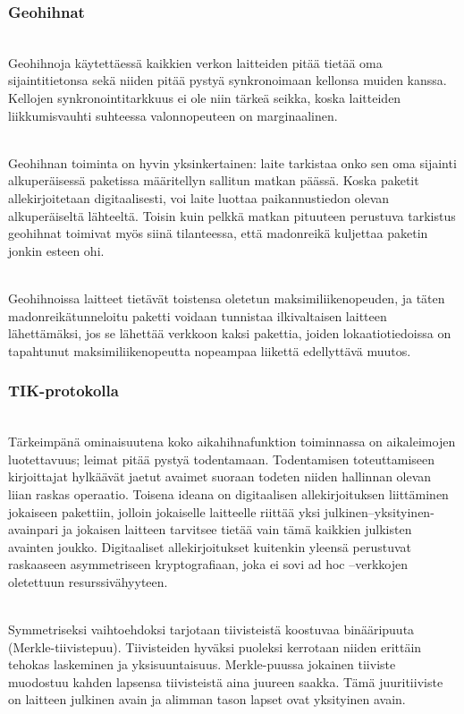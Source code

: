 \documentclass[finnish]{tktltiki2}
\theoremstyle{definition}
\theoremstyle{remark}
\begin{document}
\subsubsection{Geohihnat}
\noindent \\
Geohihnoja käytettäessä kaikkien verkon laitteiden pitää tietää oma sijaintitietonsa sekä niiden pitää pystyä synkronoimaan kellonsa muiden kanssa. Kellojen synkronointitarkkuus ei ole niin tärkeä seikka, koska laitteiden liikkumisvauhti suhteessa valonnopeuteen on marginaalinen.

\noindent \\
Geohihnan toiminta on hyvin yksinkertainen: laite tarkistaa onko sen oma sijainti alkuperäisessä paketissa määritellyn sallitun matkan päässä. Koska paketit allekirjoitetaan digitaalisesti, voi laite luottaa paikannustiedon olevan alkuperäiseltä lähteeltä. Toisin kuin pelkkä matkan pituuteen perustuva tarkistus geohihnat toimivat myös siinä tilanteessa, että madonreikä kuljettaa paketin jonkin esteen ohi.

\noindent \\
Geohihnoissa laitteet tietävät toistensa oletetun maksimiliikenopeuden, ja täten madonreikätunneloitu paketti voidaan tunnistaa ilkivaltaisen laitteen lähettämäksi, jos se lähettää verkkoon kaksi pakettia, joiden lokaatiotiedoissa on tapahtunut maksimiliikenopeutta nopeampaa liikettä edellyttävä muutos.

\subsubsection{TIK-protokolla} 
\label{tik}
\noindent \\
Tärkeimpänä ominaisuutena koko aikahihnafunktion toiminnassa on aikaleimojen luotettavuus; leimat pitää pystyä todentamaan. Todentamisen toteuttamiseen kirjoittajat hylkäävät jaetut avaimet suoraan todeten niiden hallinnan olevan liian raskas operaatio. Toisena ideana on digitaalisen allekirjoituksen liittäminen jokaiseen pakettiin, jolloin jokaiselle laitteelle riittää yksi julkinen--yksityinen-avainpari ja jokaisen laitteen tarvitsee tietää vain tämä kaikkien julkisten avainten joukko. Digitaaliset allekirjoitukset kuitenkin yleensä perustuvat raskaaseen asymmetriseen kryptografiaan, joka ei sovi ad hoc –verkkojen oletettuun resurssivähyyteen.

\noindent \\
Symmetriseksi vaihtoehdoksi tarjotaan tiivisteistä koostuvaa binääripuuta (Merkle-tiivistepuu). Tiivisteiden hyväksi puoleksi kerrotaan niiden erittäin tehokas laskeminen ja yksisuuntaisuus. Merkle-puussa jokainen tiiviste muodostuu kahden lapsensa tiivisteistä aina juureen saakka. Tämä juuritiiviste on laitteen julkinen avain ja alimman tason lapset ovat yksityinen avain.
\end{document}
